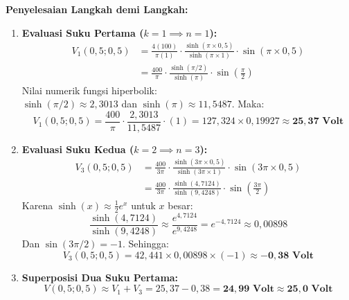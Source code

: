 \documentclass[11pt,a4paper]{article}
\theoremstyle{definition}
\begin{document}
\noindent\textbf{Penyelesaian Langkah demi Langkah:}
\begin{enumerate}[leftmargin=*]
    \item \textbf{Evaluasi Suku Pertama ($k=1 \implies n=1$):}
    \begin{align*}
        V_1(0{,}5; 0{,}5) &= \frac{4(100)}{\pi(1)} \cdot \frac{\sinh(\pi \times 0{,}5)}{\sinh(\pi \times 1)} \cdot \sin(\pi \times 0{,}5) \\
        &= \frac{400}{\pi} \cdot \frac{\sinh(\pi / 2)}{\sinh(\pi)} \cdot \sin\left(\frac{\pi}{2}\right)
    \end{align*}
    Nilai numerik fungsi hiperbolik: \\
    $\sinh(\pi/2) \approx 2{,}3013$ dan $\sinh(\pi) \approx 11{,}5487$. Maka:
    \begin{equation*}
        V_1(0{,}5; 0{,}5) = \frac{400}{\pi} \cdot \frac{2{,}3013}{11{,}5487} \cdot (1) = 127{,}324 \times 0{,}19927 \approx \mathbf{25{,}37\text{ Volt}}
    \end{equation*}
    
    \item \textbf{Evaluasi Suku Kedua ($k=2 \implies n=3$):}
    \begin{align*}
        V_3(0{,}5; 0{,}5) &= \frac{400}{3\pi} \cdot \frac{\sinh(3\pi \times 0{,}5)}{\sinh(3\pi \times 1)} \cdot \sin(3\pi \times 0{,}5) \\
        &= \frac{400}{3\pi} \cdot \frac{\sinh(4{,}7124)}{\sinh(9{,}4248)} \cdot \sin\left(\frac{3\pi}{2}\right)
    \end{align*}
    Karena $\sinh(x) \approx \frac{1}{2}e^x$ untuk $x$ besar:
    \begin{equation*}
        \frac{\sinh(4{,}7124)}{\sinh(9{,}4248)} \approx \frac{e^{4{,}7124}}{e^{9{,}4248}} = e^{-4{,}7124} \approx 0{,}00898
    \end{equation*}
    Dan $\sin(3\pi/2) = -1$. Sehingga:
    \begin{equation*}
        V_3(0{,}5; 0{,}5) = 42{,}441 \times 0{,}00898 \times (-1) \approx \mathbf{-0{,}38\text{ Volt}}
    \end{equation*}
    
    \item \textbf{Superposisi Dua Suku Pertama:}
    \begin{equation*}
        V(0{,}5; 0{,}5) \approx V_1 + V_3 = 25{,}37 - 0{,}38 = \mathbf{24{,}99\text{ Volt}} \approx \mathbf{25{,}0\text{ Volt}}
    \end{equation*}
    

\end{enumerate}
\end{document}
